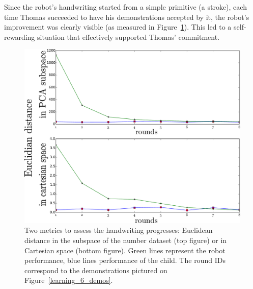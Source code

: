 \documentclass[conference]{IEEEtran}
\begin{document}
Since the robot's handwriting started from a simple primitive (a stroke), each
time Thomas succeeded to have his demonstrations accepted by it, the robot's
improvement was clearly visible (as measured in Figure~\ref{Thomas_distances}).
This led to a self-rewarding situation that effectively supported Thomas'
commitment.

\begin{figure}
    \centering
    \includegraphics[width=0.9\linewidth]{learning_6_distances}
    \caption{\small Two metrics to assess the handwriting progresses: Euclidean
    distance in the subspace of the number dataset (top figure) or in
Cartesian space (bottom figure). Green lines represent the robot performance,
blue lines performance of the child. The round IDs correspond to the demonstrations
pictured on Figure~\ref{learning_6_demos}.}
    \label{Thomas_distances}
\end{figure}

\end{document}
